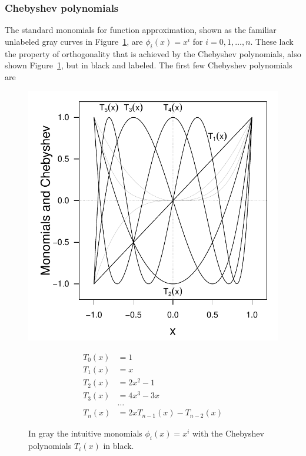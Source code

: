 \documentclass[11pt]{article}
\begin{document}
\subsubsection{Chebyshev polynomials}
The standard monomials for function approximation, shown as the familiar unlabeled gray curves in Figure~\ref{fig::cheb}, are \(\phi_i(x) = x^i\) for \(i=0, 1, \dots, n\). These lack the property of orthogonality that is achieved by the Chebyshev polynomials, also shown Figure~\ref{fig::cheb}, but in black and labeled. The first few Chebyshev polynomials are
%
\begin{figure}[ht!]\centering

\begin{minipage}[c]{0.48\textwidth}
\includegraphics[width=\textwidth]{3_approximation/cheb_funs.pdf}

\end{minipage}
\begin{minipage}[c]{0.48\textwidth}
\begin{align*}
T_0(x) & = 1\\
T_1(x) & = x\\
T_2(x) & = 2x^2-1\\
T_3(x) & = 4x^3-3x\\
 & \dots\\
T_n(x) & = 2xT_{n-1}(x) - T_{n-2}(x)
\end{align*}

\caption{In gray the intuitive monomials \(\phi_i(x) = x^i\) with the Chebyshev polynomials \(T_i(x)\) in black.}\label{fig::cheb}

\end{minipage}
\end{figure}
\end{document}
